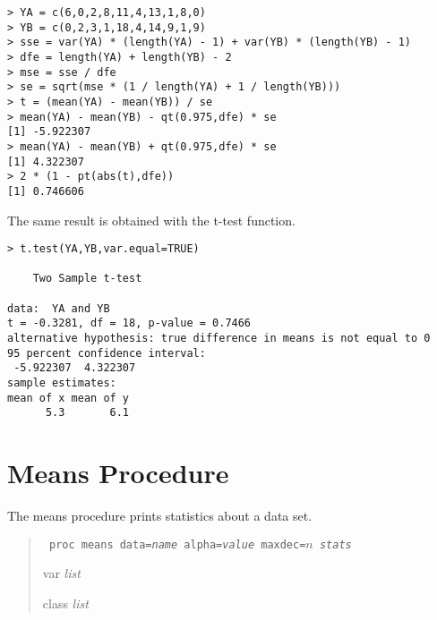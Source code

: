 \documentclass[12pt]{article}
\begin{document}
\begin{Verbatim}
> YA = c(6,0,2,8,11,4,13,1,8,0)
> YB = c(0,2,3,1,18,4,14,9,1,9)
> sse = var(YA) * (length(YA) - 1) + var(YB) * (length(YB) - 1)
> dfe = length(YA) + length(YB) - 2
> mse = sse / dfe
> se = sqrt(mse * (1 / length(YA) + 1 / length(YB)))
> t = (mean(YA) - mean(YB)) / se
> mean(YA) - mean(YB) - qt(0.975,dfe) * se
[1] -5.922307
> mean(YA) - mean(YB) + qt(0.975,dfe) * se
[1] 4.322307
> 2 * (1 - pt(abs(t),dfe))
[1] 0.746606
\end{Verbatim}

The same result is obtained with the t-test function.

\begin{Verbatim}
> t.test(YA,YB,var.equal=TRUE)

	Two Sample t-test

data:  YA and YB
t = -0.3281, df = 18, p-value = 0.7466
alternative hypothesis: true difference in means is not equal to 0
95 percent confidence interval:
 -5.922307  4.322307
sample estimates:
mean of x mean of y 
      5.3       6.1 
\end{Verbatim}

\newpage

\section{Means Procedure}
The means procedure prints statistics about a data set.

\begin{quote}
{\tt
proc means data={\it name} alpha={\it value} maxdec=$n$ {\it stats}

var {\it list}

class {\it list}
}
\end{quote}
\end{document}
